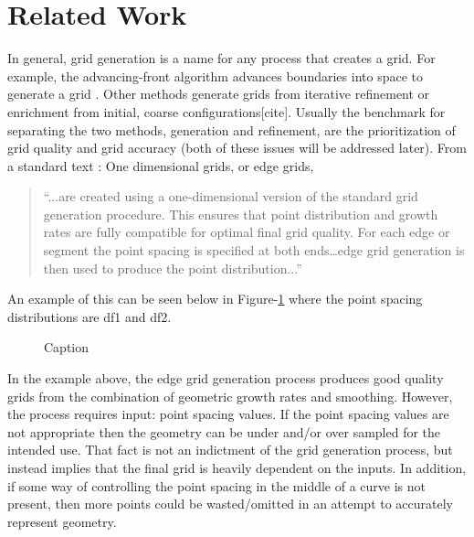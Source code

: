\section{Related Work}
In general, grid generation is a name for any process that creates a grid.  For example, the advancing-front algorithm advances boundaries into space to generate a grid \cite{lohner88}.  Other methods generate grids from iterative refinement or enrichment from initial, coarse configurations[cite].  Usually the benchmark for separating the two methods, generation and refinement, are the prioritization of grid quality and grid accuracy (both of these issues will be addressed later).  From a standard text \cite{thompson98}: One dimensional grids, or edge grids, \begin{quotation} \noindent ``...are created using a one-dimensional version of the standard grid generation procedure.  This ensures that point distribution and growth rates are fully compatible for optimal final grid quality.  For each edge or segment the point spacing is specified at both ends…edge grid generation is then used to produce the point distribution...'' \end{quotation} An example of this can be seen below in Figure-\ref{EdgeGrid_HandbookOfGridGeneration} where the point spacing distributions are df1 and df2.

\begin{figure}[h!]
  \caption{\label{EdgeGrid_HandbookOfGridGeneration} Caption}
\end{figure}

\noindent In the example above, the edge grid generation process produces good quality grids from the combination of geometric growth rates and smoothing.  However, the process requires input: point spacing values.  If the point spacing values are not appropriate then the geometry can be under and/or over sampled for the intended use.  That fact is not an indictment of the grid generation process, but instead implies that the final grid is heavily dependent on the inputs.  In addition, if some way of controlling the point spacing in the middle of a curve is not present, then more points could be wasted/omitted in an attempt to accurately represent geometry.

